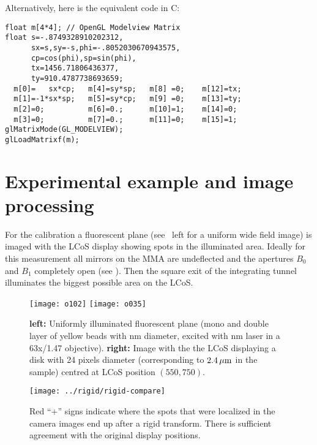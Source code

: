Alternatively, here is the equivalent code in C:

{\small
\begin{verbatim}
float m[4*4]; // OpenGL Modelview Matrix
float s=-.8749328910202312,
      sx=s,sy=-s,phi=-.8052030670943575,
      cp=cos(phi),sp=sin(phi),
      tx=1456.71806436377,
      ty=910.4787738693659;
  m[0]=   sx*cp;   m[4]=sy*sp;   m[8] =0;    m[12]=tx; 
  m[1]=-1*sx*sp;   m[5]=sy*cp;   m[9] =0;    m[13]=ty; 
  m[2]=0;          m[6]=0.;      m[10]=1;    m[14]=0;  
  m[3]=0;          m[7]=0.;      m[11]=0;    m[15]=1;  
glMatrixMode(GL_MODELVIEW);
glLoadMatrixf(m);
\end{verbatim}
}
\section{Experimental example and image processing}

For the calibration a fluorescent plane (see
~left for a uniform wide field image) is imaged
with the LCoS display showing spots in the illuminated area.  Ideally
for this measurement all mirrors on the MMA are undeflected and the
apertures $B_0$ and $B_1$ completely open (see
). Then the square exit of the integrating
tunnel illuminates the biggest possible area on the LCoS.

\begin{figure}[!hbt]
  \centering
  \texttt{[image: o102]}
  \texttt{[image: o035]}
  \caption{{\bf left:} Uniformly illuminated fluorescent plane (mono
    and double layer of yellow beads with \unit[110]{nm} diameter,
    excited with \unit[473]{nm} laser in a 63x/1.47 objective). {\bf
      right:} Image with the the LCoS displaying a disk with 24 pixels
    diameter (corresponding to $\unit[2.4]{\mu m}$ in the sample)
    centred at LCoS position $(550,750)$.}
  \label{fig:rigid-pics}
\end{figure}


\begin{figure}[!hbt]
  \centering
  \texttt{[image: ../rigid/rigid-compare]}
  \caption{Red ``$+$'' signs indicate where the spots that were
    localized in the camera images end up after a rigid
    transform. There is sufficient agreement with the original
    display positions.}
  \label{fig:rigid-compare}
\end{figure}

